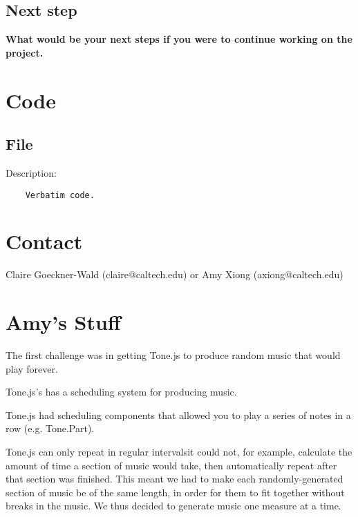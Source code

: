 \documentclass[12pt,a4paper]{article}
\begin{document}
\subsection{Next step}
\textbf{What would be your next steps if you were to continue working on the project.}


\section{Code}

\subsection{File}

\begin{center}
Description:
	\begin{verbatim}
	Verbatim code.
	\end{verbatim}
\end{center}


\section{Contact}

Claire Goeckner-Wald (claire@caltech.edu) or Amy Xiong (axiong@caltech.edu)


\section{Amy's Stuff}

The first challenge was in getting Tone.js to produce random music that would play forever.

Tone.js's has a scheduling system for producing music.

Tone.js had scheduling components that allowed you to play a series of notes in a row (e.g. Tone.Part).

Tone.js can only repeat in regular intervals\textemdash it could not, for example, calculate the amount of time a section of music would take, then automatically repeat after that section was finished. This meant we had to make each randomly-generated section of music be of the same length, in order for them to fit together without breaks in the music. We thus decided to generate music one measure at a time.
\end{document}
